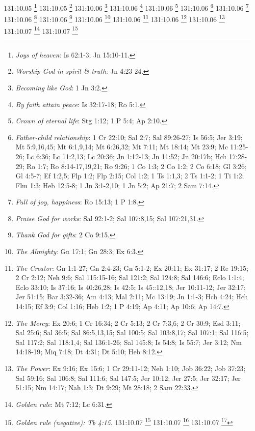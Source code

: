 {{{{{{{{{{{{{{{{{{{{{{{{{{{{{{131:10.05 \footnote{\textit{Joys of heaven}: Is 62:1-3; Jn 15:10-11.}
131:10.05 \footnote{\textit{Worship God in spirit & truth}: Jn 4:23-24.}
131:10.06 \footnote{\textit{Becoming like God}: 1 Jn 3:2.}
131:10.06 \footnote{\textit{By faith attain peace}: Is 32:17-18; Ro 5:1.}
131:10.06 \footnote{\textit{Crown of eternal life}: Stg 1:12; 1 P 5:4; Ap 2:10.}
131:10.06 \footnote{\textit{Father-child relationship}: 1 Cr 22:10; Sal 2:7; Sal 89:26-27; Is 56:5; Jer 3:19; Mt 5:9,16,45; Mt 6:1,9,14; Mt 6:26,32; Mt 7:11; Mt 18:14; Mt 23:9; Mc 11:25-26; Lc 6:36; Lc 11:2,13; Lc 20:36; Jn 1:12-13; Jn 11:52; Jn 20:17b; Hch 17:28-29; Ro 1:7; Ro 8:14-17,19,21; Ro 9:26; 1 Co 1:3; 2 Co 1:2; 2 Co 6:18; Gl 3:26; Gl 4:5-7; Ef 1:2,5; Flp 1:2; Flp 2:15; Col 1:2; 1 Ts 1:1,3; 2 Ts 1:1-2; 1 Ti 1:2; Flm 1:3; Heb 12:5-8; 1 Jn 3:1-2,10; 1 Jn 5:2; Ap 21:7; 2 Sam 7:14.}
131:10.06 \footnote{\textit{Full of joy, happiness}: Ro 15:13; 1 P 1:8.}
131:10.06 \footnote{\textit{Praise God for works}: Sal 92:1-2; Sal 107:8,15; Sal 107:21,31.}
131:10.06 \footnote{\textit{Thank God for gifts}: 2 Co 9:15.}
131:10.06 \footnote{\textit{The Almighty}: Gn 17:1; Gn 28:3; Ex 6:3.}
131:10.06 \footnote{\textit{The Creator}: Gn 1:1-27; Gn 2:4-23; Gn 5:1-2; Ex 20:11; Ex 31:17; 2 Re 19:15; 2 Cr 2:12; Neh 9:6; Sal 115:15-16; Sal 121:2; Sal 124:8; Sal 146:6; Eclo 1:1:4; Eclo 33:10; Is 37:16; Is 40:26,28; Is 42:5; Is 45::12,18; Jer 10:11-12; Jer 32:17; Jer 51:15; Bar 3:32-36; Am 4:13; Mal 2:11; Mc 13:19; Jn 1:1-3; Hch 4:24; Hch 14:15; Ef 3:9; Col 1:16; Heb 1:2; 1 P 4:19; Ap 4:11; Ap 10:6; Ap 14:7.}
131:10.06 \footnote{\textit{The Mercy}: Ex 20:6; 1 Cr 16:34; 2 Cr 5:13; 2 Cr 7:3,6; 2 Cr 30:9; Esd 3:11; Sal 25:6; Sal 36:5; Sal 86:5,13,15; Sal 100:5; Sal 103:8,17; Sal 107:1; Sal 116:5; Sal 117:2; Sal 118:1,4; Sal 136:1-26; Sal 145:8; Is 54:8; Is 55:7; Jer 3:12; Nm 14:18-19; Miq 7:18; Dt 4:31; Dt 5:10; Heb 8:12.}
131:10.06 \footnote{\textit{The Power}: Ex 9:16; Ex 15:6; 1 Cr 29:11-12; Neh 1:10; Job 36:22; Job 37:23; Sal 59:16; Sal 106:8; Sal 111:6; Sal 147:5; Jer 10:12; Jer 27:5; Jer 32:17; Jer 51:15; Nm 14:17; Nah 1:3; Dt 9:29; Mt 28:18; 2 Sam 22:33.}
131:10.07 \footnote{\textit{Golden rule}: Mt 7:12; Lc 6:31.}
131:10.07 \footnote{\textit{Golden rule (negative): Tb 4:15.}
131:10.07 \footnote{\textit{Prove all things, choose good}: 1 Ts 5:21.}
131:10.07 \footnote{\textit{Spiritual Brotherhood}: Mt 12:50; Mc 3:35; Lc 8:21; Heb 2:11.}
131:10.07 \footnote{\textit{Whosoever will are saved}: Sal 50:15; Jl 2:32; Zac 13:9; Mt 7:24; Mt 10:32-33; Mt 12:50; Mt 16:24-25; Mc 3:35; Mc 8:34-35; Lc 6:47; Lc 9:23-24; Lc 12:8; Jn 3:15-16; Jn 4:13-14; Jn 11:25-26; Jn 12:46; Hch 2:21; Hch 10:43; Hch 13:26; Ro 9:33; Ro 10:13; 1 Jn 2:23; 1 Jn 4:15; 1 Jn 5:1; Ap 22:17b.}
}}}}}}}}}}}}}}}}}}}}}}}}}}}}}}}
